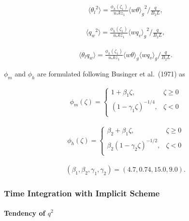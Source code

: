 \begin{eqnarray}\langle {\theta_l}^2\rangle=\frac{\phi_h\left(\zeta_1\right)}{u_*kz_1}{\langle w\theta \rangle_g}^2 \bigg/ \frac{q}{B_2L}, \end{eqnarray}

\begin{eqnarray}\langle {q_w}^2\rangle=\frac{\phi_h\left(\zeta_1\right)}{u_*kz_1}{\langle wq_v\rangle_g}^2 \bigg/ \frac{q}{B_2L}, \end{eqnarray}

\begin{eqnarray}\langle \theta_lq_w\rangle=\frac{\phi_h\left(\zeta_1\right)}{u_*kz_1}\langle w\theta \rangle_g\langle wq_v \rangle_g \bigg/ \frac{q}{B_2L}. \end{eqnarray}

\(\phi_m\) and \(\phi_h\) are formulated following Businger et
al.~(1971) as

\begin{eqnarray}
\phi_m(\zeta)=\left\{
    \begin{array}{lr}
      1+\beta_1\zeta, &\zeta\ge 0\\
      \left(1-\gamma_1\zeta\right)^{-1/4}, &\zeta< 0\\
    \end{array}
  \right.
\end{eqnarray}

\begin{eqnarray}
\phi_h(\zeta)=\left\{
    \begin{array}{lr}
      \beta_2+\beta_1\zeta, &\zeta\ge 0\\
      \beta_2\left(1-\gamma_2\zeta\right)^{-1/2}, &\zeta< 0\\
    \end{array}
  \right.
\end{eqnarray}

\begin{eqnarray}(\beta_1,\beta_2,\gamma_1,\gamma_2)=(4.7,0.74,15.0,9.0).\end{eqnarray}

\hypertarget{time-integration-with-implicit-scheme}{%
\subsubsection{Time Integration with Implicit
Scheme}\label{time-integration-with-implicit-scheme}}

\hypertarget{tendency-of-q2}{%
\paragraph{\texorpdfstring{Tendency of
\(q^2\)}{Tendency of q\^{}2}}\label{tendency-of-q2}}

